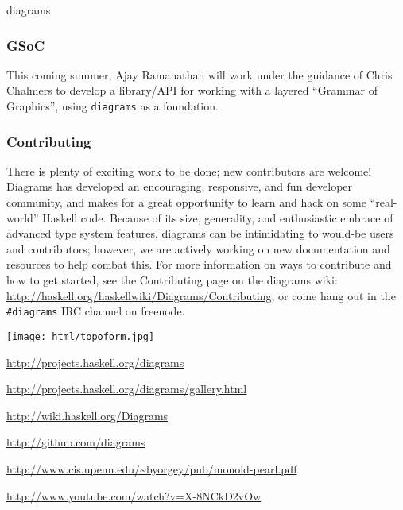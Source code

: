 \begin{hcarentry}[updated]{diagrams}
\subsubsection*{GSoC}

This coming summer, Ajay Ramanathan will work under the guidance of
Chris Chalmers to develop a library/API for working with a layered
``Grammar of Graphics'', using \texttt{diagrams} as a foundation.

\subsubsection*{Contributing}

There is plenty of exciting work to be done; new contributors are
welcome!  Diagrams has developed an encouraging, responsive, and fun
developer community, and makes for a great opportunity to learn and
hack on some ``real-world'' Haskell code.  Because of its size,
generality, and enthusiastic embrace of advanced type system features,
diagrams can be intimidating to would-be users and contributors;
however, we are actively working on new documentation and resources to
help combat this.  For more information on ways to contribute and how
to get started, see the Contributing page on the diagrams wiki:
\url{http://haskell.org/haskellwiki/Diagrams/Contributing}, or come
hang out in the \texttt{\#diagrams} IRC channel on freenode.

\begin{center}
\texttt{[image: html/topoform.jpg]}
\end{center}

\FurtherReading
\begin{compactitem}
\item \url{http://projects.haskell.org/diagrams}
\item \url{http://projects.haskell.org/diagrams/gallery.html}
\item \url{http://wiki.haskell.org/Diagrams}
\item \url{http://github.com/diagrams}
\item \url{http://www.cis.upenn.edu/~byorgey/pub/monoid-pearl.pdf}
\item \url{http://www.youtube.com/watch?v=X-8NCkD2vOw}
\end{compactitem}
\end{hcarentry}
